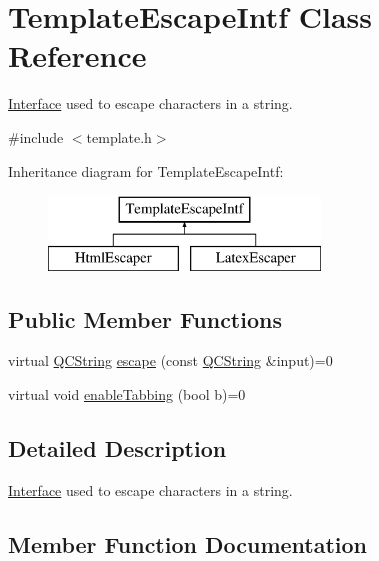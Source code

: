 \hypertarget{class_template_escape_intf}{}\section{Template\+Escape\+Intf Class Reference}
\label{class_template_escape_intf}


\mbox{\hyperlink{class_interface}{Interface}} used to escape characters in a string.  




{\ttfamily \#include $<$template.\+h$>$}

Inheritance diagram for Template\+Escape\+Intf\+:\begin{figure}[H]
\begin{center}
\leavevmode
\includegraphics[height=2.000000cm]{class_template_escape_intf}
\end{center}
\end{figure}
\subsection*{Public Member Functions}
\begin{DoxyCompactItemize}
\item 
virtual \mbox{\hyperlink{class_q_c_string}{Q\+C\+String}} \mbox{\hyperlink{class_template_escape_intf_a9fc463a8281aca9f982866aa26d4f401}{escape}} (const \mbox{\hyperlink{class_q_c_string}{Q\+C\+String}} \&input)=0
\item 
virtual void \mbox{\hyperlink{class_template_escape_intf_a40faf7453afe73ccdb52fa8d2619ac3d}{enable\+Tabbing}} (bool b)=0
\end{DoxyCompactItemize}


\subsection{Detailed Description}
\mbox{\hyperlink{class_interface}{Interface}} used to escape characters in a string. 

\subsection{Member Function Documentation}
\mbox{\label{class_template_escape_intf_a40faf7453afe73ccdb52fa8d2619ac3d}} 
